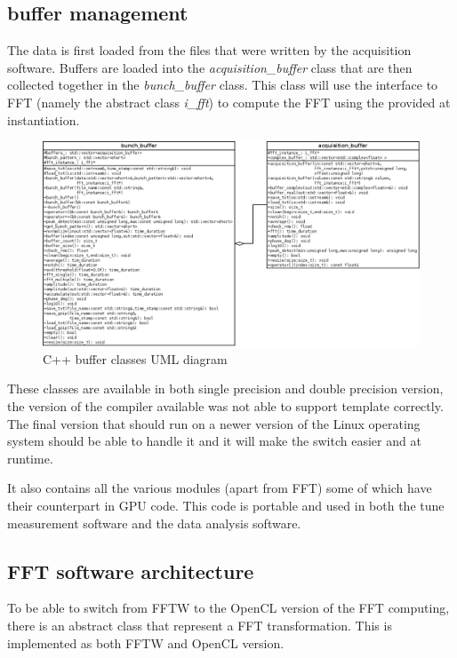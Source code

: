 \subsection{buffer management}

The data is first loaded from the files that were written by the acquisition software. Buffers are loaded into the \emph{acquisition\_buffer} class that are then collected together in the \emph{bunch\_buffer} class. This class will use the interface to \gls{FFT} (namely the abstract class \emph{i\_fft}) to compute the \gls{FFT} using the provided at instantiation.

\begin{figure}[H]
\centering
\caption{C++ buffer classes UML diagram}
\includegraphics[scale=0.3]{buffer_uml.png}
\end{figure}

These classes are available in both single precision and double precision version, the version of the compiler available was not able to support template correctly. The final version that should run on a newer version of the Linux operating system should be able to handle it and it will make the switch easier and at runtime.

It also contains all the various modules (apart from \gls{FFT}) some of which have their counterpart in \gls{GPU} code. This code is portable and used in both the tune measurement software and the data analysis software.

\subsection{FFT software architecture}

To be able to switch from \gls{FFTW} to the \gls{OpenCL} version of the \gls{FFT} computing, there is an abstract class that represent a \gls{FFT} transformation. This is implemented as both \gls{FFTW} and \gls{OpenCL} version.

